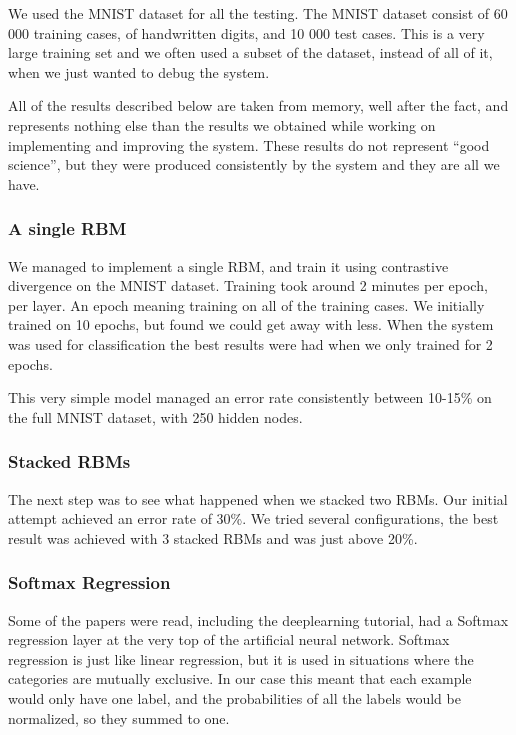 \documentclass[11pt]{article}
\begin{document}
We used the MNIST dataset for all the testing.  The MNIST dataset consist of 60 000 training cases, of handwritten digits, and 10 000 test cases.  This is a very large training set and we often used a subset of the dataset, instead of all of it, when we just wanted to debug the system.

All of the results described below are taken from memory, well after the fact, and represents nothing else than the results we obtained while working on implementing and improving the system.  These results do not represent ``good science'', but they were produced consistently by the system and they are all we have.

\subsubsection{A single RBM}

We managed to implement a single RBM, and train it using contrastive divergence on the MNIST dataset.  Training took around 2 minutes per epoch, per layer.  An epoch meaning training on all of the training cases. We initially trained on 10 epochs, but found we could get away with less. When the system was used for classification the best results were had when we only trained for 2 epochs.

This very simple model managed an error rate consistently between 10-15\% on the full MNIST dataset, with 250 hidden nodes.

\subsubsection{Stacked RBMs}

The next step was to see what happened when we stacked two RBMs.  Our initial attempt achieved an error rate of 30\%.  We tried several configurations, the best result was achieved with 3 stacked RBMs and was just above 20\%.

\subsubsection{Softmax Regression}

Some of the papers were read, including the deeplearning tutorial, had a Softmax regression layer at the very top of the artificial neural network.  Softmax regression is just like linear regression, but it is used in situations where the categories are mutually exclusive.  In our case this meant that each example would only have one label, and the probabilities of all the labels would be normalized, so they summed to one.
\end{document}
